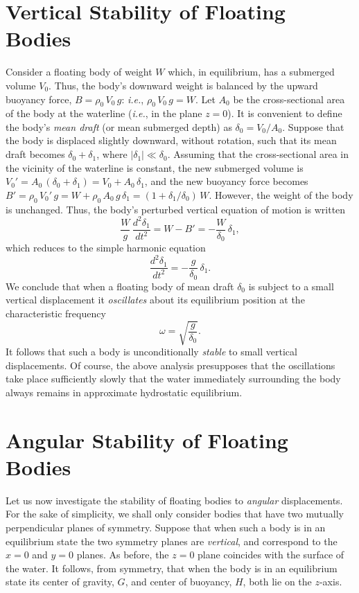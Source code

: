 \section{Vertical Stability of  Floating Bodies}
Consider a floating body of weight $W$ which, in equilibrium, has  a submerged volume $V_0$. Thus, the body's downward weight is balanced by the upward buoyancy force, $B = \rho_0\,V_0\,g$: {\em i.e.},  $\rho_0\, V_0\,g=W$. Let $A_0$ be the cross-sectional area of the body at the waterline ({\em i.e.}, in the
plane $z=0$). It is convenient to define the body's {\em mean draft}\/ (or mean submerged depth) as $\delta_0= V_0/A_0$. Suppose that the
body is displaced slightly downward, without rotation, such that its mean draft becomes $\delta_0+\delta_1$, where
$|\delta_1|\ll \delta_0$. 
Assuming that the
cross-sectional area in the vicinity of the waterline  is constant, the new submerged volume is  $V_0'=A_0\,(\delta_0+\delta_1)= V_0 + A_0\,\delta_1$, and the
new buoyancy force becomes $B'=\rho_0\,V_0'\,g=W+ \rho_0\,A_0\,g\,\delta_1=(1+\delta_1/\delta_0)\,W$. However, the weight of the body  is unchanged. Thus, 
the body's perturbed vertical equation of motion  is written
\begin{equation}
\frac{W}{g}\,\frac{d^2 \delta_1}{dt^2} = W- B' = -\frac{W}{\delta_0}\,\delta_1,
\end{equation}
which reduces to the simple harmonic equation
\begin{equation}
\frac{d^2 \delta_1}{dt^2} = - \frac{g}{\delta_0}\,\delta_1.
\end{equation}
We conclude that when a floating body of mean draft $\delta_0$ is subject to a small vertical displacement it {\em oscillates}\/  about its equilibrium position at the
characteristic frequency
\begin{equation}
\omega = \sqrt{\frac{g}{\delta_0}}.
\end{equation}
It follows that such a body is unconditionally {\em stable}\/ to small vertical displacements. Of course, the above analysis presupposes
that the oscillations take place sufficiently slowly that the water immediately surrounding the  body always remains
in approximate hydrostatic equilibrium. 

\section{Angular Stability of Floating Bodies}\label{s3x6}
Let us now investigate the  stability of  floating bodies to {\em angular}\/ displacements.  For the sake of simplicity, we shall
only consider bodies that have two mutually perpendicular 
planes of symmetry. Suppose that when such a  body is in an equilibrium state the 
two symmetry planes are   {\em vertical},  and correspond to the $x=0$ and $y=0$ planes.
As before, the $z=0$ plane coincides with the surface of the water. It follows, from symmetry,  that when the body is
in an equilibrium
state  its center of gravity, $G$, and center of buoyancy, $H$, both lie on the $z$-axis. 

